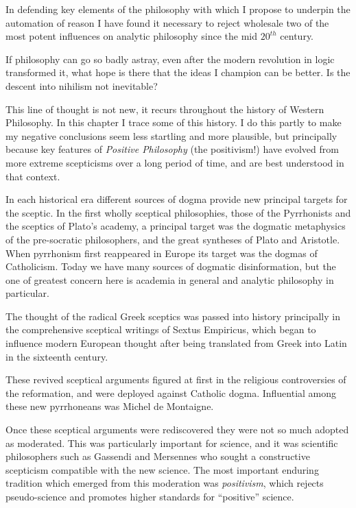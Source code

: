 In defending key elements of the philosophy with which I propose to
underpin the automation of reason I have found it necessary to reject
wholesale two of the most potent influences on analytic philosophy
since the mid $20^{th}$ century.

If philosophy can go so badly astray, even after the modern revolution
in logic transformed it, what hope is there that the ideas I champion
can be better. 
Is the descent into nihilism not inevitable?

This line of thought is not new, it recurs throughout the history of
Western Philosophy. 
In this chapter I trace some of this history.
I do this partly to make my negative conclusions seem less startling
and more plausible, but principally because key features of
\emph{Positive Philosophy} (the positivism!) have evolved from more
extreme scepticisms over a long period of time, and are best
understood in that context. 

In each historical era different sources of dogma provide new
principal targets for the sceptic.  
In the first wholly sceptical philosophies, those of the Pyrrhonists
and the sceptics of Plato's academy, a principal target was the
dogmatic metaphysics of the pre-socratic philosophers, and the great
syntheses of Plato and Aristotle. 
When pyrrhonism first reappeared in Europe its target was the dogmas
of Catholicism. 
Today we have many sources of dogmatic disinformation, but the one of
greatest concern here is academia in general and analytic philosophy
in particular. 

The thought of the radical Greek sceptics was passed into history
principally in the comprehensive sceptical writings of Sextus
Empiricus\cite{sextusempiricusOOP}, which began to influence modern
European thought after being translated from Greek into Latin in the
sixteenth century. 

These revived sceptical arguments figured at first in the religious
controversies of the reformation, and were deployed against Catholic
dogma. 
Influential among these new pyrrhoneans was Michel de Montaigne.

Once these sceptical arguments were rediscovered they were not so much
adopted as moderated. 
This was particularly important for science, and it was scientific
philosophers such as Gassendi and Mersennes who sought a constructive
scepticism compatible with the new science.
The most important enduring tradition which emerged from this
moderation was \emph{positivism}, which rejects pseudo-science and
promotes higher standards for ``positive'' science. 

